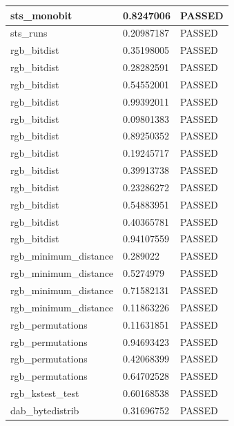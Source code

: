 \documentclass[conference]{IEEEtran}
\begin{document}
\begin{center}
\begin{table}
\begin{tabular}{|l|l|l|}
sts\_monobit                           & 0.8247006  & PASSED \\ \hline
sts\_runs                              & 0.20987187 & PASSED \\ \hline
rgb\_bitdist                           & 0.35198005 & PASSED \\ \hline
rgb\_bitdist                           & 0.28282591 & PASSED \\ \hline
rgb\_bitdist                           & 0.54552001 & PASSED \\ \hline
rgb\_bitdist                           & 0.99392011 & PASSED \\ \hline
rgb\_bitdist                           & 0.09801383 & PASSED \\ \hline
rgb\_bitdist                           & 0.89250352 & PASSED \\ \hline
rgb\_bitdist                           & 0.19245717 & PASSED \\ \hline
rgb\_bitdist                           & 0.39913738 & PASSED \\ \hline
rgb\_bitdist                           & 0.23286272 & PASSED \\ \hline
rgb\_bitdist                           & 0.54883951 & PASSED \\ \hline
rgb\_bitdist                           & 0.40365781 & PASSED \\ \hline
rgb\_bitdist                           & 0.94107559 & PASSED \\ \hline
rgb\_minimum\_distance                 & 0.289022   & PASSED \\ \hline
rgb\_minimum\_distance                 & 0.5274979  & PASSED \\ \hline
rgb\_minimum\_distance                 & 0.71582131 & PASSED \\ \hline
rgb\_minimum\_distance                 & 0.11863226 & PASSED \\ \hline
rgb\_permutations                      & 0.11631851 & PASSED \\ \hline
rgb\_permutations                      & 0.94693423 & PASSED \\ \hline
rgb\_permutations                      & 0.42068399 & PASSED \\ \hline
rgb\_permutations                      & 0.64702528 & PASSED \\ \hline
rgb\_kstest\_test                      & 0.60168538 & PASSED \\ \hline
dab\_bytedistrib                       & 0.31696752 & PASSED \\ \hline

\end{tabular}
\end{table}
\end{center}
\end{document}
